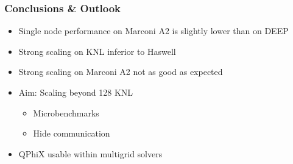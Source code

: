 \documentclass{beamer}
\begin{document}

  \begin{frame}
    \frametitle{Conclusions \& Outlook}

    \begin{itemize}
      \item Single node performance on Marconi A2 is slightly lower than on DEEP
      \item Strong scaling on KNL inferior to Haswell
      \item Strong scaling on Marconi A2 not as good as expected
    \end{itemize}

    \vfill

    \begin{itemize}
      \item Aim: Scaling beyond 128 KNL
        \begin{itemize}
            \item Microbenchmarks
            \item Hide communication
        \end{itemize}
      \item QPhiX usable within multigrid solvers
    \end{itemize}
  \end{frame}


  \begin{frame}
    \titlepage
  \end{frame}

  
\end{document}
